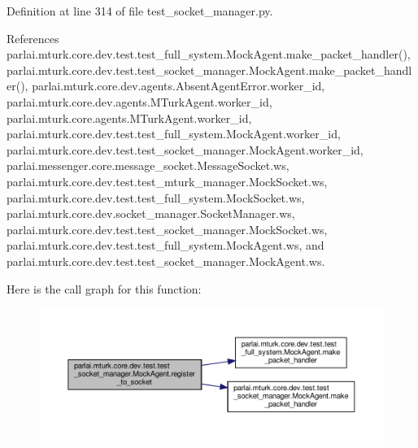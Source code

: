 Definition at line 314 of file test\+\_\+socket\+\_\+manager.\+py.



References parlai.\+mturk.\+core.\+dev.\+test.\+test\+\_\+full\+\_\+system.\+Mock\+Agent.\+make\+\_\+packet\+\_\+handler(), parlai.\+mturk.\+core.\+dev.\+test.\+test\+\_\+socket\+\_\+manager.\+Mock\+Agent.\+make\+\_\+packet\+\_\+handler(), parlai.\+mturk.\+core.\+dev.\+agents.\+Absent\+Agent\+Error.\+worker\+\_\+id, parlai.\+mturk.\+core.\+dev.\+agents.\+M\+Turk\+Agent.\+worker\+\_\+id, parlai.\+mturk.\+core.\+agents.\+M\+Turk\+Agent.\+worker\+\_\+id, parlai.\+mturk.\+core.\+dev.\+test.\+test\+\_\+full\+\_\+system.\+Mock\+Agent.\+worker\+\_\+id, parlai.\+mturk.\+core.\+dev.\+test.\+test\+\_\+socket\+\_\+manager.\+Mock\+Agent.\+worker\+\_\+id, parlai.\+messenger.\+core.\+message\+\_\+socket.\+Message\+Socket.\+ws, parlai.\+mturk.\+core.\+dev.\+test.\+test\+\_\+mturk\+\_\+manager.\+Mock\+Socket.\+ws, parlai.\+mturk.\+core.\+dev.\+test.\+test\+\_\+full\+\_\+system.\+Mock\+Socket.\+ws, parlai.\+mturk.\+core.\+dev.\+socket\+\_\+manager.\+Socket\+Manager.\+ws, parlai.\+mturk.\+core.\+dev.\+test.\+test\+\_\+socket\+\_\+manager.\+Mock\+Socket.\+ws, parlai.\+mturk.\+core.\+dev.\+test.\+test\+\_\+full\+\_\+system.\+Mock\+Agent.\+ws, and parlai.\+mturk.\+core.\+dev.\+test.\+test\+\_\+socket\+\_\+manager.\+Mock\+Agent.\+ws.

Here is the call graph for this function\+:
\nopagebreak
\begin{figure}[H]
\begin{center}
\leavevmode
\includegraphics[width=350pt]{classparlai_1_1mturk_1_1core_1_1dev_1_1test_1_1test__socket__manager_1_1MockAgent_a1eeabaf756b6545e416829d002778006_cgraph}
\end{center}
\end{figure}
\mbox{\label{classparlai_1_1mturk_1_1core_1_1dev_1_1test_1_1test__socket__manager_1_1MockAgent_aa6b3ec5ae40ee38cb6114ee0f6bba21e}} 
